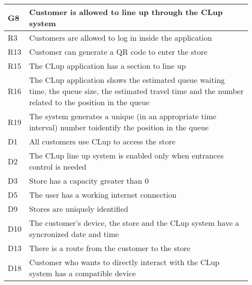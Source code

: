 \begin{center}
        {\renewcommand{\arraystretch}{1.5}
        \begin{longtable}{L{2cm}L{12cm}}
            \hline
            \textbf{G8} & \textbf{Customer is allowed to line up through the CLup system} \\
            \hline
             R3 & Customers are allowed to log in inside the application \\
            \hline
             R13 & Customer can generate a QR code to enter the store \\
            \hline
             R15 & The CLup application has a section to line up \\
            \hline
             R16 & The CLup application shows the estimated queue waiting time, the queue size, the estimated travel time and the number related to the position in the queue \\
            \hline
             R19 & The system generates a unique (in an appropriate time interval) number toidentify the position in the queue \\
            \hline
             D1 & All customers use CLup to access the store \\
            \hline
             D2 & The CLup line up system is enabled only when entrances control is needed \\
            \hline
             D3 & Store has a capacity greater than 0 \\
            \hline
             D5 & The user has a working internet connection \\
            \hline
             D9 & Stores are uniquely identified \\
            \hline
             D10 & The customer’s device, the store and the CLup system have a syncronized date and time \\
            \hline
             D13 & There is a route from the customer to the store \\
            \hline
             D18 & Customer who wants to directly interact with the CLup system has a compatible device \\
            \hline
        \end{longtable}}


\end{center}
